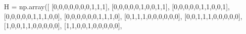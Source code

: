 \documentclass[
  letterpaper,
  DIV=11,
  numbers=noendperiod]{scrartcl}
\newenvironment{Shaded}{\begin{snugshade}}{\end{snugshade}}
\newcommand{\DecValTok}[1]{\textcolor[rgb]{0.68,0.00,0.00}{#1}}
\newcommand{\NormalTok}[1]{\textcolor[rgb]{0.00,0.23,0.31}{#1}}
\newcommand{\OperatorTok}[1]{\textcolor[rgb]{0.37,0.37,0.37}{#1}}
\begin{document}
\begin{Shaded}
\begin{Highlighting}[]
\NormalTok{H }\OperatorTok{=}\NormalTok{ np.array([}
\NormalTok{    [}\DecValTok{0}\NormalTok{,}\DecValTok{0}\NormalTok{,}\DecValTok{0}\NormalTok{,}\DecValTok{0}\NormalTok{,}\DecValTok{0}\NormalTok{,}\DecValTok{0}\NormalTok{,}\DecValTok{0}\NormalTok{,}\DecValTok{1}\NormalTok{,}\DecValTok{1}\NormalTok{,}\DecValTok{1}\NormalTok{],  }
\NormalTok{    [}\DecValTok{0}\NormalTok{,}\DecValTok{0}\NormalTok{,}\DecValTok{0}\NormalTok{,}\DecValTok{0}\NormalTok{,}\DecValTok{0}\NormalTok{,}\DecValTok{1}\NormalTok{,}\DecValTok{0}\NormalTok{,}\DecValTok{0}\NormalTok{,}\DecValTok{1}\NormalTok{,}\DecValTok{1}\NormalTok{],  }
\NormalTok{    [}\DecValTok{0}\NormalTok{,}\DecValTok{0}\NormalTok{,}\DecValTok{0}\NormalTok{,}\DecValTok{0}\NormalTok{,}\DecValTok{0}\NormalTok{,}\DecValTok{1}\NormalTok{,}\DecValTok{1}\NormalTok{,}\DecValTok{0}\NormalTok{,}\DecValTok{0}\NormalTok{,}\DecValTok{1}\NormalTok{],  }
\NormalTok{    [}\DecValTok{0}\NormalTok{,}\DecValTok{0}\NormalTok{,}\DecValTok{0}\NormalTok{,}\DecValTok{0}\NormalTok{,}\DecValTok{0}\NormalTok{,}\DecValTok{1}\NormalTok{,}\DecValTok{1}\NormalTok{,}\DecValTok{1}\NormalTok{,}\DecValTok{0}\NormalTok{,}\DecValTok{0}\NormalTok{],  }
\NormalTok{    [}\DecValTok{0}\NormalTok{,}\DecValTok{0}\NormalTok{,}\DecValTok{0}\NormalTok{,}\DecValTok{0}\NormalTok{,}\DecValTok{0}\NormalTok{,}\DecValTok{0}\NormalTok{,}\DecValTok{1}\NormalTok{,}\DecValTok{1}\NormalTok{,}\DecValTok{1}\NormalTok{,}\DecValTok{0}\NormalTok{],  }
\NormalTok{    [}\DecValTok{0}\NormalTok{,}\DecValTok{1}\NormalTok{,}\DecValTok{1}\NormalTok{,}\DecValTok{1}\NormalTok{,}\DecValTok{0}\NormalTok{,}\DecValTok{0}\NormalTok{,}\DecValTok{0}\NormalTok{,}\DecValTok{0}\NormalTok{,}\DecValTok{0}\NormalTok{,}\DecValTok{0}\NormalTok{],  }
\NormalTok{    [}\DecValTok{0}\NormalTok{,}\DecValTok{0}\NormalTok{,}\DecValTok{1}\NormalTok{,}\DecValTok{1}\NormalTok{,}\DecValTok{1}\NormalTok{,}\DecValTok{0}\NormalTok{,}\DecValTok{0}\NormalTok{,}\DecValTok{0}\NormalTok{,}\DecValTok{0}\NormalTok{,}\DecValTok{0}\NormalTok{],  }
\NormalTok{    [}\DecValTok{1}\NormalTok{,}\DecValTok{0}\NormalTok{,}\DecValTok{0}\NormalTok{,}\DecValTok{1}\NormalTok{,}\DecValTok{1}\NormalTok{,}\DecValTok{0}\NormalTok{,}\DecValTok{0}\NormalTok{,}\DecValTok{0}\NormalTok{,}\DecValTok{0}\NormalTok{,}\DecValTok{0}\NormalTok{],  }
\NormalTok{    [}\DecValTok{1}\NormalTok{,}\DecValTok{1}\NormalTok{,}\DecValTok{0}\NormalTok{,}\DecValTok{0}\NormalTok{,}\DecValTok{1}\NormalTok{,}\DecValTok{0}\NormalTok{,}\DecValTok{0}\NormalTok{,}\DecValTok{0}\NormalTok{,}\DecValTok{0}\NormalTok{,}\DecValTok{0}\NormalTok{],  }

\end{Highlighting}
\end{Shaded}
\end{document}
